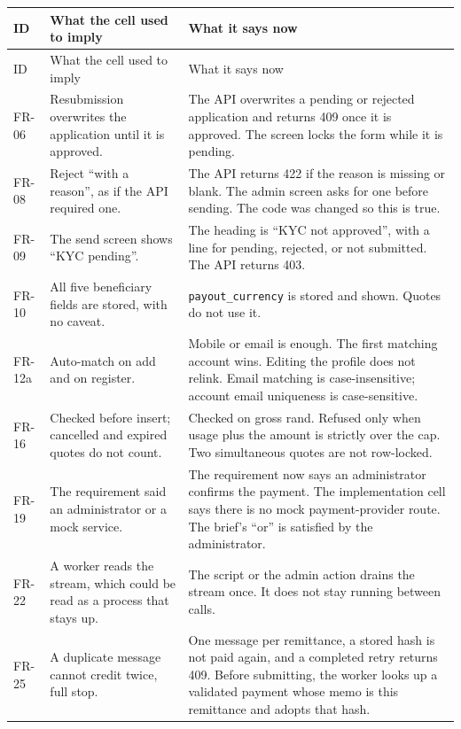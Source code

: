 \documentclass[11pt,a4paper]{article}
\begin{document}
{\small
\begin{longtable}{@{}>{\raggedright\arraybackslash}p{1.35cm}>{\raggedright\arraybackslash}p{6.3cm}>{\raggedright\arraybackslash}p{7.1cm}@{}}
\toprule
ID & What the cell used to imply & What it says now \\
\midrule
\endfirsthead
\toprule
ID & What the cell used to imply & What it says now \\
\midrule
\endhead
\bottomrule
\endfoot
FR-06 &
Resubmission overwrites the application until it is approved. &
The API overwrites a pending or rejected application and returns 409 once it is approved.
The screen locks the form while it is pending. \\
FR-08 &
Reject ``with a reason'', as if the API required one. &
The API returns 422 if the reason is missing or blank.
The admin screen asks for one before sending.
The code was changed so this is true. \\
FR-09 &
The send screen shows ``KYC pending''. &
The heading is ``KYC not approved'', with a line for pending, rejected, or not submitted.
The API returns 403. \\
FR-10 &
All five beneficiary fields are stored, with no caveat. &
\texttt{payout\_currency} is stored and shown.
Quotes do not use it. \\
FR-12a &
Auto-match on add and on register. &
Mobile or email is enough.
The first matching account wins.
Editing the profile does not relink.
Email matching is case-insensitive; account email uniqueness is case-sensitive. \\
FR-16 &
Checked before insert; cancelled and expired quotes do not count. &
Checked on gross rand.
Refused only when usage plus the amount is strictly over the cap.
Two simultaneous quotes are not row-locked. \\
FR-19 &
The requirement said an administrator or a mock service. &
The requirement now says an administrator confirms the payment.
The implementation cell says there is no mock payment-provider route.
The brief's ``or'' is satisfied by the administrator. \\
FR-22 &
A worker reads the stream, which could be read as a process that stays up. &
The script or the admin action drains the stream once.
It does not stay running between calls. \\
FR-25 &
A duplicate message cannot credit twice, full stop. &
One message per remittance, a stored hash is not paid again, and a completed retry returns 409.
Before submitting, the worker looks up a validated payment whose memo is this remittance and adopts that hash.

\end{longtable}}
\end{document}
